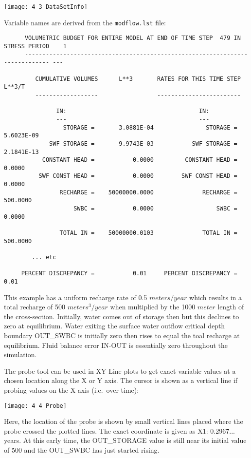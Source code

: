        \texttt{[image: 4\_3\_DataSetInfo]}

Variable names are derived from the {\tt modflow.lst} file:
\begin{verbatim}
      VOLUMETRIC BUDGET FOR ENTIRE MODEL AT END OF TIME STEP  479 IN STRESS PERIOD    1
      ----------------------------------------------------------------------------- ---

         CUMULATIVE VOLUMES      L**3       RATES FOR THIS TIME STEP      L**3/T
         ------------------                 ------------------------

               IN:                                      IN:
               ---                                      ---
                 STORAGE =       3.0881E-04               STORAGE =       5.6023E-09
             SWF STORAGE =       9.9743E-03           SWF STORAGE =       2.1841E-13
           CONSTANT HEAD =           0.0000         CONSTANT HEAD =           0.0000
          SWF CONST HEAD =           0.0000        SWF CONST HEAD =           0.0000
                RECHARGE =    50000000.0000              RECHARGE =         500.0000
                    SWBC =           0.0000                  SWBC =           0.0000

                TOTAL IN =    50000000.0103              TOTAL IN =         500.0000

        ... etc

     PERCENT DISCREPANCY =           0.01     PERCENT DISCREPANCY =           0.01
\end{verbatim}


This example has a uniform recharge rate of 0.5 $meters/year$ which results in a total recharge of 500 $meters^{3}/year$ when multiplied by the 1000 $meter$ length of the cross-section. Initially, water comes out of storage then but this declines to zero at equilibrium.  Water exiting the surface water outflow critical depth boundary  {\sf OUT\_SWBC} is initially zero then rises to equal the toal recharge at equilibrium.  Fluid balance error {\sf IN-OUT} is essentially zero throughout the simulation.

The probe tool can be used in {\sf XY Line} plots to get exact variable values at a chosen location along the X or Y axis.  The cursor is shown as a vertical line if probing values on the X-axis (i.e.\ over time):

        \texttt{[image: 4\_4\_Probe]}

Here, the location of the probe is shown by small vertical lines placed where the probe crossed the plotted lines.  The exact coordinate is given as {\sf X1: 0.2967...}  years.  At this early time, the {\sf OUT\_STORAGE} value is still near its initial value of 500 and the {\sf OUT\_SWBC} has just started rising.

